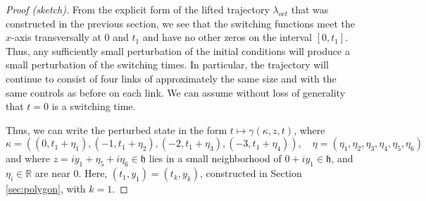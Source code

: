\documentclass{article}
\theoremstyle{remark}
\newcommand{\ring}[1]{\mathbb{#1}}
\def\h{\mathfrak h}
\begin{document}
\begin{proof}[Proof (sketch)] From the explicit form of the lifted
  trajectory $\lambda_{oct}$ that was constructed in the previous
  section, we see that the switching functions meet the $x$-axis
  transversally at $0$ and $t_1$ and have no other zeros on the
  interval $[0,t_1]$.  Thus, any sufficiently small perturbation of
  the initial conditions will produce a small perturbation of the
  switching times.  In particular, the trajectory will continue to
  consist of four links of approximately the same size and with the
  same controls as before on each link.  We can assume without loss of
  generality that $t=0$ is a switching time.

Thus, we can write the perturbed state in the form
$t\mapsto\gamma(\kappa,z,t)$, where 
\[
\kappa = ((0,t_1+\eta_1),(-1,t_1+\eta_2),(-2,t_1+\eta_3),(-3,t_1+\eta_4)),
\quad \eta = (\eta_1,\eta_2,\eta_3,\eta_4,\eta_5,\eta_6)
\]
and where $z= iy_1 + \eta_5+i \eta_6\in\h$ lies in a small neighborhood of
$0+i y_1\in\h$, and $\eta_i\in\ring{R}$ are near $0$.  Here,
$(t_1,y_1)=(t_k,y_k)$, constructed in Section \ref{sec:polygon}, with $k=1$.


\end{proof}
\end{document}
